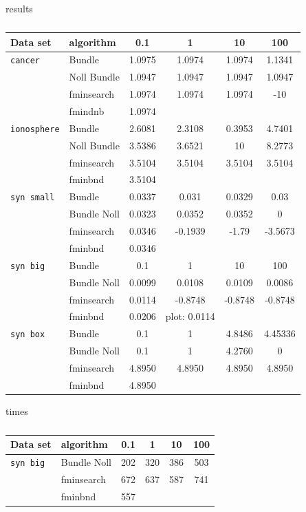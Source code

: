 results

\begin{center}
\begin{table}[H]%
	\begin{tabular}{llcccc}
		\hline
    Data set & algorithm & 0.1 & 1 & 10 & 100 \\
		\hline
		\texttt{cancer} & Bundle & 1.0975 & 1.0974 & 1.0974 & 1.1341 \\
		 & Noll Bundle & 1.0947 & 1.0947 & 1.0947 & 1.0947 \\
		 &  fminsearch & 1.0974 & 1.0974 & 1.0974 & -10 \\
		 & fmindnb & 1.0974 \\
		\texttt{ionosphere} & Bundle & 2.6081 & 2.3108 & 0.3953 & 4.7401 \\
		 & Noll Bundle & 3.5386 & 3.6521 & 10 & 8.2773 \\
		 & fminsearch & 3.5104 & 3.5104 & 3.5104 & 3.5104 \\
		 & fminbnd & 3.5104 \\
		\texttt{syn small} & Bundle & 0.0337 & 0.031 & 0.0329& 0.03 \\
		 & Bundle Noll & 0.0323 & 0.0352 & 0.0352 & 0 \\
		 & fminsearch & 0.0346 & -0.1939 & -1.79 & -3.5673 \\
		 & fminbnd & 0.0346 \\
		\texttt{syn big} & Bundle & 0.1 & 1 & 10 & 100 \\
		 & Bundle Noll & 0.0099 & 0.0108 & 0.0109 & 0.0086 \\
		 & fminsearch & 0.0114 & -0.8748 & -0.8748 & -0.8748 \\
		 & fminbnd & 0.0206 & plot: 0.0114\\
		\texttt{syn box} & Bundle & 0.1 & 1 & 4.8486 & 4.45336 \\
		 & Bundle Noll & 0.1 & 1 & 4.2760 & 0 \\
		 & fminsearch & 4.8950 & 4.8950 & 4.8950 & 4.8950 \\
		 & fminbnd & 4.8950 \\
	\end{tabular}
	\caption{}
\end{table}
\end{center}

times

\begin{center}
\begin{table}[H]%
	\begin{tabular}{llcccc}
		\hline
    Data set & algorithm & 0.1 & 1 & 10 & 100 \\
		\hline
		\texttt{syn big} & Bundle Noll & 202 & 320 & 386 & 503 \\
		 & fminsearch & 672 & 637 & 587 & 741 \\
		 & fminbnd & 557
	\end{tabular}
	\caption{}
\end{table}
\end{center}

